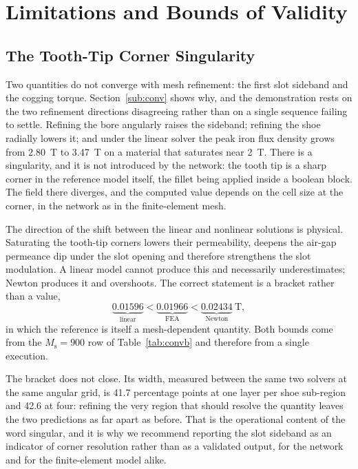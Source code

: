\documentclass[10pt,a4paper,twocolumn]{article}
\theoremstyle{plain}
\theoremstyle{remark}
\begin{document}


\section{Limitations and Bounds of Validity}
\label{sec:bounds}

\subsection{The Tooth-Tip Corner Singularity}
\label{sub:corner}

Two quantities do not converge with mesh refinement: the first slot
sideband and the cogging torque. Section~\ref{sub:conv} shows why, and
the demonstration rests on the two refinement directions disagreeing
rather than on a single sequence failing to settle. Refining the bore
angularly raises the sideband; refining the shoe radially lowers it; and
under the linear solver the peak iron flux density grows from
\SI{2.80}{\tesla} to \SI{3.47}{\tesla} on a material that saturates near
\SI{2}{\tesla}. There is a singularity, and it is not introduced by the
network: the tooth tip is a sharp corner in the reference model itself,
the fillet being applied inside a boolean block. The field there
diverges, and the computed value depends on the cell size at the
corner, in the network as in the finite-element mesh.

The direction of the shift between the linear and nonlinear solutions is
physical. Saturating the tooth-tip corners lowers their permeability,
deepens the air-gap permeance dip under the slot opening and therefore
strengthens the slot modulation. A linear model cannot produce this and
necessarily underestimates; Newton produces it and overshoots. The
correct statement is a bracket rather than a value,
\begin{equation}
\underbrace{0.01596}_{\text{linear}} <
\underbrace{0.01966}_{\text{FEA}} <
\underbrace{0.02434}_{\text{Newton}}\ \si{\tesla},
\label{eq:bracket}
\end{equation}
in which the reference is itself a mesh-dependent quantity. Both bounds
come from the $M_{\mathrm{s}}=900$ row of Table~\ref{tab:convb} and
therefore from a single execution.

The bracket does not close. Its width, measured between the same two
solvers at the same angular grid, is \num{41.7} percentage points at one
layer per shoe sub-region and \num{42.6} at four: refining the very
region that should resolve the quantity leaves the two predictions as
far apart as before. That is the operational content of the word
singular, and it is why we recommend reporting the slot sideband as an
indicator of corner resolution rather than as a validated output, for
the network and for the finite-element model alike.
\end{document}
